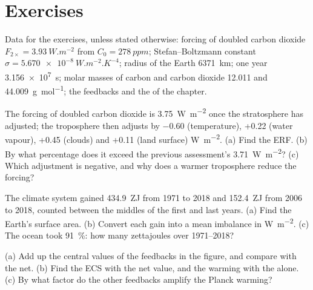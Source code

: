 \section*{Exercises}\label{sec:b2:anthropogenic-climate-change:exercises}

Data for the exercises, unless stated otherwise: forcing of doubled carbon dioxide $F_{2\times} =
\qty{3.93}{W.m^{-2}}$ from $C_0 = \qty{278}{ppm}$; Stefan--Boltzmann constant $\sigma =
\qty{5.670e-8}{W.m^{-2}.K^{-4}}$; radius of the Earth \qty{6371}{km}; one year
\qty{3.156e7}{s}; molar masses of carbon and carbon dioxide 12.011 and \qty{44.009}{g.mol^{-1}};
the feedbacks and the  of the chapter.

\begin{exercise}[$\star$]\label{exo:b2:anthropogenic-climate-change:1}
The forcing of doubled carbon dioxide is \qty{3.75}{W.m^{-2}} once the stratosphere has adjusted;
the troposphere then adjusts by $-0.60$ (temperature), +0.22 (water vapour), +0.45 (clouds) and
+0.11 (land surface) \unit{W.m^{-2}}. (a) Find the ERF. (b) By what percentage does it exceed the
previous assessment's \qty{3.71}{W.m^{-2}}? (c) Which adjustment is negative, and why does a warmer
troposphere reduce the forcing?
\end{exercise}

\begin{exercise}[$\star$]\label{exo:b2:anthropogenic-climate-change:2}
The climate system gained \qty{434.9}{ZJ} from 1971 to 2018 and \qty{152.4}{ZJ} from 2006 to 2018,
counted between the middles of the first and last years. (a) Find the Earth's surface area.
(b) Convert each gain into a mean imbalance in \unit{W.m^{-2}}. (c) The ocean took
\qty{91}{\percent}: how many zettajoules over 1971--2018?
\end{exercise}

\begin{exercise}[$\star$]\label{exo:b2:anthropogenic-climate-change:3}
(a) Add up the central values of the feedbacks in the figure, and compare with the net. (b) Find
the ECS with the net value, and the warming with the  alone. (c) By what factor do
the other feedbacks amplify the Planck warming?
\end{exercise}

